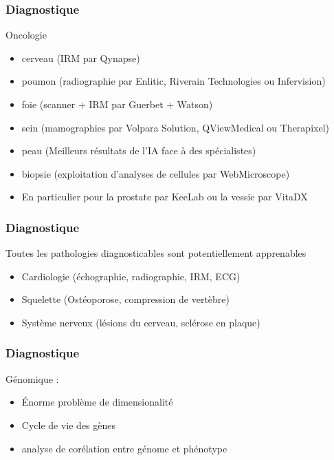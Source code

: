 \begin{frame}
  \frametitle{Diagnostique}
  Oncologie
  \begin{itemize}
  \item cerveau (IRM par Qynapse)
  \item poumon (radiographie par Enlitic, Riverain Technologies ou Infervision)
  \item foie (scanner + IRM par Guerbet + Watson)
  \item sein (mamographies par Volpara Solution, QViewMedical ou Therapixel)
  \item peau (Meilleurs résultats de l'IA face à des spécialistes)
  \item biopsie (exploitation d'analyses de cellules par WebMicroscope)
  \item     En particulier pour la prostate par KeeLab ou la vessie par VitaDX
  \end{itemize}
\end{frame}

\begin{frame}
  \frametitle{Diagnostique}
  Toutes les pathologies diagnosticables sont potentiellement apprenables
    \begin{itemize}
    \item Cardiologie (échographie, radiographie, IRM, ECG)
    \item Squelette (Ostéoporose, compression de vertèbre)
    \item Système nerveux (lésions du cerveau, sclérose en plaque)
    \end{itemize}
\end{frame}

\begin{frame}
  \frametitle{Diagnostique}
  Génomique :
  \newline
  \begin{minipage}[c]{0.49\linewidth}
    \begin{itemize}
    \item Énorme problème de dimensionalité
    \item Cycle de vie des gènes
    \item analyse de corélation entre génome et phénotype
    \end{itemize}
  \end{minipage}\hfill
  \begin{minipage}[c]{0.49\linewidth}
  \end{minipage}\hfill
\end{frame}

